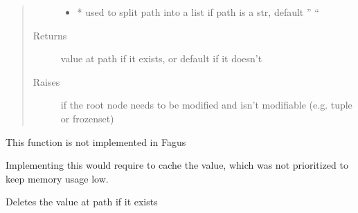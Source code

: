 \documentclass[a4paper,10pt,english]{sphinxmanual}
\begin{document}
\begin{fulllineitems}
\begin{fulllineitems}
\begin{quote}
\begin{description}
\begin{itemize}
\item {}
\sphinxAtStartPar
{} \textendash{} * used to split path into a list if path is a str, default ” “

\end{itemize}

\item[{Returns}] \leavevmode
\sphinxAtStartPar
value at path if it exists, or default if it doesn’t

\item[{Raises}] \leavevmode
\sphinxAtStartPar
{} \textendash{} if the root node needs to be modified and isn’t modifiable (e.g. tuple or frozenset)

\end{description}\end{quote}

\end{fulllineitems}


\begin{fulllineitems}
\label{\detokenize{fagus.fagus:fagus.fagus.Fagus.popitem}}
\pysigstartsignatures
{}
\pysigstopsignatures
\sphinxAtStartPar
This function is not implemented in Fagus

\sphinxAtStartPar
Implementing this would require to cache the value, which was not prioritized to keep memory usage low.

\end{fulllineitems}


\begin{fulllineitems}
\label{\detokenize{fagus.fagus:fagus.fagus.Fagus.discard}}
\pysigstartsignatures
{}
\pysigstopsignatures
\sphinxAtStartPar
Deletes the value at path if it exists


\end{fulllineitems}
\end{fulllineitems}
\end{document}
